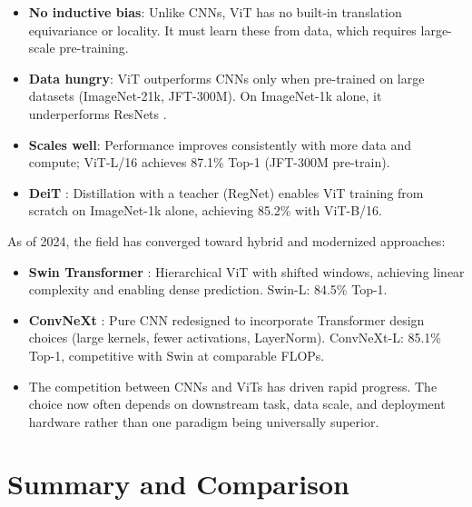 \begin{properties}
\begin{itemize}
    \item \textbf{No inductive bias}: Unlike CNNs, ViT has no built-in translation equivariance or locality. It must learn these from data, which requires large-scale pre-training.
    \item \textbf{Data hungry}: ViT outperforms CNNs only when pre-trained on large datasets (ImageNet-21k, JFT-300M). On ImageNet-1k alone, it underperforms ResNets \cite{dosovitskiy2020image}.
    \item \textbf{Scales well}: Performance improves consistently with more data and compute; ViT-L/16 achieves 87.1\% Top-1 (JFT-300M pre-train).
    \item \textbf{DeiT} \cite{touvron2021training}: Distillation with a teacher (RegNet) enables ViT training from scratch on ImageNet-1k alone, achieving 85.2\% with ViT-B/16.
\end{itemize}
\end{properties}

\begin{note}
As of 2024, the field has converged toward hybrid and modernized approaches:
\begin{itemize}
    \item \textbf{Swin Transformer} \cite{liu2021swin}: Hierarchical ViT with shifted windows, achieving linear complexity and enabling dense prediction. Swin-L: 84.5\% Top-1.
    \item \textbf{ConvNeXt} \cite{liu2022convnet}: Pure CNN redesigned to incorporate Transformer design choices (large kernels, fewer activations, LayerNorm). ConvNeXt-L: 85.1\% Top-1, competitive with Swin at comparable FLOPs.
    \item The competition between CNNs and ViTs has driven rapid progress. The choice now often depends on downstream task, data scale, and deployment hardware rather than one paradigm being universally superior.
\end{itemize}
\end{note}

\section{Summary and Comparison}

